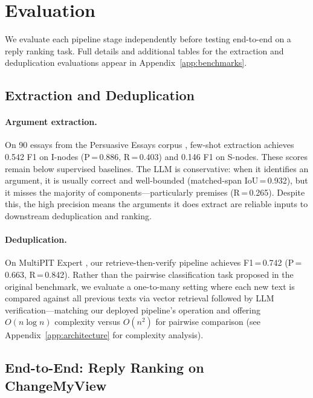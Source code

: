 
\section{Evaluation}

We evaluate each pipeline stage independently before testing end-to-end on a reply ranking task. Full details and additional tables for the extraction and deduplication evaluations appear in Appendix~\ref{app:benchmarks}.

\subsection{Extraction and Deduplication}

\paragraph{Argument extraction.} On 90 essays from the Persuasive Essays corpus \citep{stab-gurevych-2014-annotating}, few-shot extraction achieves 0.542 F1 on I-nodes (P\,=\,0.886, R\,=\,0.403) and 0.146 F1 on S-nodes. These scores remain below supervised baselines. The LLM is conservative: when it identifies an argument, it is usually correct and well-bounded (matched-span IoU\,=\,0.932), but it misses the majority of components---particularly premises (R\,=\,0.265). Despite this, the high precision means the arguments it does extract are reliable inputs to downstream deduplication and ranking.

\paragraph{Deduplication.} On MultiPIT Expert \citep{dou-etal-2022-improving}, our retrieve-then-verify pipeline achieves F1\,=\,0.742 (P\,=\,0.663, R\,=\,0.842). Rather than the pairwise classification task proposed in the original benchmark, we evaluate a one-to-many setting where each new text is compared against all previous texts via vector retrieval followed by LLM verification---matching our deployed pipeline's operation and offering $O(n \log n)$ complexity versus $O(n^2)$ for pairwise comparison (see Appendix~\ref{app:architecture} for complexity analysis).

\subsection{End-to-End: Reply Ranking on ChangeMyView}

